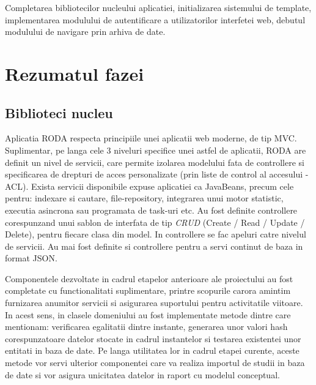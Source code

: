 \documentclass[a4paper, 10pt]{article}
\begin{document}

Completarea bibliotecilor nucleului aplicatiei, initializarea sistemului de
template, implementarea modulului de autentificare a utilizatorilor interfetei
web, debutul modulului de navigare prin arhiva de date.

\section{Rezumatul fazei}

\medskip

\subsection*{Biblioteci nucleu}

\medskip

Aplicatia RODA respecta principiile unei aplicatii web moderne, de tip MVC. Suplimentar, pe langa cele 3 niveluri specifice unei astfel de aplicatii, RODA are definit un nivel de servicii, care permite izolarea modelului fata de controllere si specificarea de drepturi de acces personalizate (prin liste de control al accesului - ACL). Exista servicii disponibile expuse aplicatiei ca JavaBeans, precum cele pentru: 
indexare si cautare, file-repository, integrarea unui motor statistic, executia asincrona sau programata de task-uri etc. 
Au fost definite controllere corespunzand unui sablon de interfata de tip \emph{CRUD}
(Create / Read / Update / Delete), pentru fiecare clasa din model. 
In controllere se fac apeluri catre nivelul de servicii. 
Au mai fost definite si controllere pentru a servi continut de baza in format JSON.

\medskip

Componentele dezvoltate in cadrul etapelor anterioare ale proiectului au fost completate cu functionalitati suplimentare, printre scopurile carora amintim furnizarea anumitor servicii si asigurarea suportului pentru activitatile viitoare. In acest sens, in clasele domeniului au fost implementate metode dintre care mentionam: verificarea egalitatii dintre instante, generarea unor valori hash corespunzatoare datelor stocate in cadrul instantelor si testarea existentei unor entitati in baza de date. Pe langa utilitatea lor in cadrul etapei curente, aceste metode vor servi ulterior componentei care va realiza importul de studii in baza de date si vor asigura unicitatea datelor in raport cu modelul conceptual. 

\medskip
\end{document}
